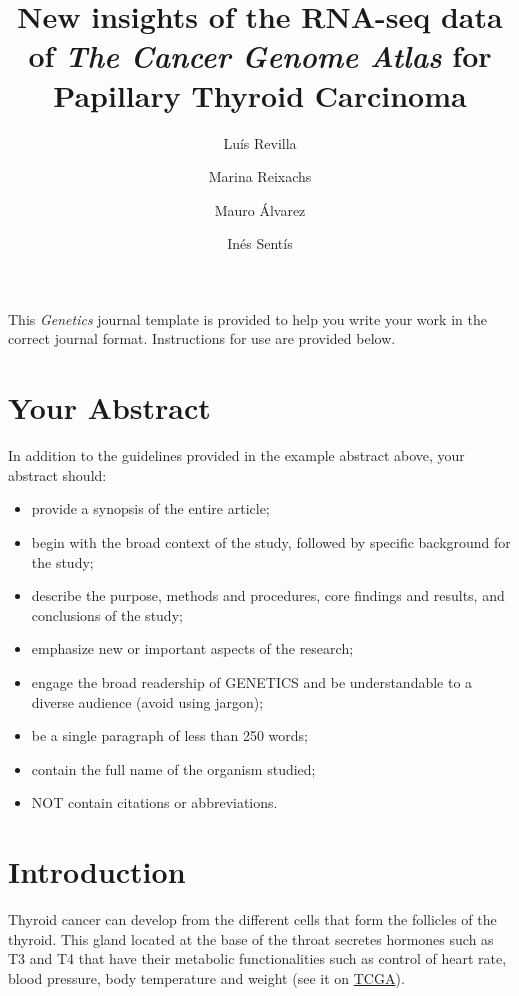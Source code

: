 \documentclass[9pt,twocolumn,twoside]{gsajnl}
\title{New insights of the RNA-seq data of \textit{The Cancer Genome Atlas} for Papillary Thyroid Carcinoma}
\author[$\ast$,1]{Luís Revilla}
\author[$\ast$]{Marina Reixachs}
\author[$\ast$]{Mauro Álvarez}
\author[$\ast$]{Inés Sentís}
\affil[$\ast$]{Universitat Pompeu Fabra}
\begin{document}
\maketitle
\thispagestyle{firststyle}
\marginmark
\firstpagefootnote
{}
\vspace{-11pt}%

\lettrine[lines=2]{\color{color2}T}{}his \textit{Genetics} journal template is provided to help you write your work in the correct journal format. Instructions for use are provided below. 


\section*{Your Abstract}

In addition to the guidelines provided in the example abstract above, your abstract should:

\begin{itemize}
\item provide a synopsis of the entire article;
\item begin with the broad context of the study, followed by specific background for the study;
\item describe the purpose, methods and procedures, core findings and results, and conclusions of the study;
\item emphasize new or important aspects of the research;
\item engage the broad readership of GENETICS and be understandable to a diverse audience (avoid using jargon);
\item be a single paragraph of less than 250 words;
\item contain the full name of the organism studied;
\item NOT contain citations or abbreviations.
\end{itemize}

\section*{Introduction}

Thyroid cancer can develop from the different cells that form the follicles of the thyroid. This gland located at the base of the throat secretes hormones such as T3 and T4 that have their metabolic functionalities such as control of heart rate, blood pressure, body temperature and weight (see it on \href{http://cancergenome.nih.gov/cancersselected/thyroid}{ TCGA}).
\end{document}
